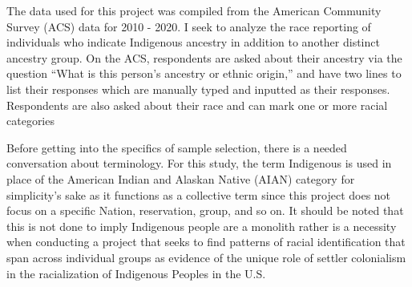 \documentclass[
  12pt,
  letterpaper,
]{article}
\begin{document}
The data used for this project was compiled from the American Community
Survey (ACS) data for 2010 - 2020. I seek to analyze the race reporting
of individuals who indicate Indigenous ancestry in addition to another
distinct ancestry group. On the ACS, respondents are asked about their
ancestry via the question ``What is this person's ancestry or ethnic
origin,'' and have two lines to list their responses which are manually
typed and inputted as their responses. Respondents are also asked about
their race and can mark one or more racial categories

Before getting into the specifics of sample selection, there is a needed
conversation about terminology. For this study, the term Indigenous is
used in place of the American Indian and Alaskan Native (AIAN) category
for simplicity's sake as it functions as a collective term since this
project does not focus on a specific Nation, reservation, group, and so
on. It should be noted that this is not done to imply Indigenous people
are a monolith rather is a necessity when conducting a project that
seeks to find patterns of racial identification that span across
individual groups as evidence of the unique role of settler colonialism
in the racialization of Indigenous Peoples in the U.S.
\end{document}
